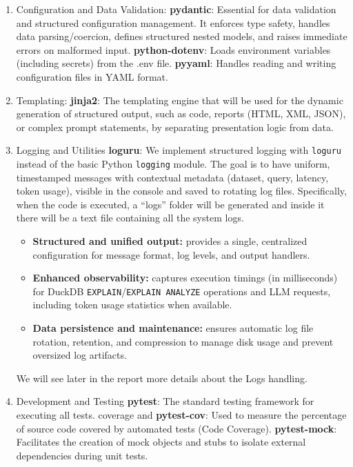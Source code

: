 \documentclass[12pt,a4paper]{article}
\begin{document}
\begin{enumerate}
  \item  Configuration and Data Validation:
  \textbf{pydantic}: Essential for data validation and structured configuration management. It enforces type safety, handles data parsing/coercion, defines structured nested models, and raises immediate errors on malformed input.
  \textbf{python-dotenv}: Loads environment variables (including secrets) from the .env file.
  \textbf{pyyaml}: Handles reading and writing configuration files in YAML format.
  \item  Templating: \textbf{jinja2}: The templating engine that will be used for the dynamic generation of structured output, such as code, reports (HTML, XML, JSON), or complex prompt statements, by separating presentation logic from data.
  \item Logging and Utilities
  \textbf{loguru}: We implement structured logging with \texttt{loguru} instead of the basic Python \texttt{logging} module. 
The goal is to have uniform, timestamped messages with contextual metadata (dataset, query, latency, token usage), visible in the console and saved to rotating log files.
Specifically, when the code is executed, a “logs” folder will be generated and inside it there will be a text file containing all the system logs.
\begin{itemize}
  \item \textbf{Structured and unified output:} provides a single, centralized configuration for message format, log levels, and output handlers.
  \item \textbf{Enhanced observability:} captures execution timings (in milliseconds) for DuckDB \texttt{EXPLAIN}/\texttt{EXPLAIN ANALYZE} operations and LLM requests, including token usage statistics when available.
  \item \textbf{Data persistence and maintenance:} ensures automatic log file rotation, retention, and compression to manage disk usage and prevent oversized log artifacts.
\end{itemize}
We will see later in the report more details about the Logs handling.
  \item Development and Testing
  \textbf{pytest}: The standard testing framework for executing all tests.
  coverage and \textbf{pytest-cov}: Used to measure the percentage of source code covered by automated tests (Code Coverage).
  \textbf{pytest-mock}: Facilitates the creation of mock objects and stubs to isolate external dependencies during unit tests.


\end{enumerate}
\end{document}
